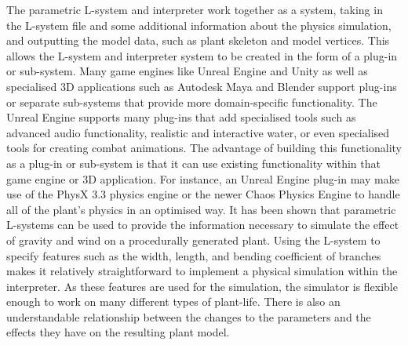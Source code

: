 The parametric L-system and interpreter work together as a system, taking in the L-system file and some additional information about the physics simulation, and outputting the model data, such as plant skeleton and model vertices. This allows the L-system and interpreter system to be created in the form of a plug-in or sub-system. Many game engines like Unreal Engine and Unity as well as specialised 3D applications such as Autodesk Maya and Blender support plug-ins or separate sub-systems that provide more domain-specific functionality. The Unreal Engine supports many plug-ins that add specialised tools such as advanced audio functionality, realistic and interactive water, or even specialised tools for creating combat animations. The advantage of building this functionality as a plug-in or sub-system is that it can use existing functionality within that game engine or 3D application. For instance, an Unreal Engine plug-in may make use of the PhysX 3.3 physics engine or the newer Chaos Physics Engine to handle all of the plant's physics in an optimised way. 
\newpage
It has been shown that parametric L-systems can be used to provide the information necessary to simulate the effect of gravity and wind on a procedurally generated plant. Using the L-system to specify features such as the width, length, and bending coefficient of branches makes it relatively straightforward to implement a physical simulation within the interpreter. As these features are used for the simulation, the simulator is flexible enough to work on many different types of plant-life. There is also an understandable relationship between the changes to the parameters and the effects they have on the resulting plant model.
